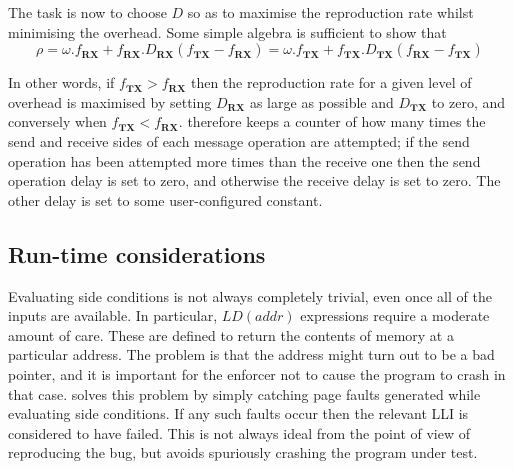The task is now to choose $D$ so as to maximise the reproduction
rate whilst minimising the overhead.  Some simple algebra is
sufficient to show that
\begin{displaymath}
\rho = {\omega}.f_{\mathbf{RX}} + f_{\mathbf{RX}}.D_{\mathbf{RX}}(f_{\mathbf{TX}} - f_{\mathbf{RX}}) = {\omega}.f_{\mathbf{TX}} + f_{\mathbf{TX}}.D_{\mathbf{TX}}(f_{\mathbf{RX}} - f_{\mathbf{TX}})
\end{displaymath}

In other words, if $f_{\mathbf{TX}} > f_{\mathbf{RX}}$ then the
reproduction rate for a given level of overhead is maximised by
setting $D_{\mathbf{RX}}$ as large as possible and $D_{\mathbf{TX}}$
to zero, and conversely when $f_{\mathbf{TX}} < f_{\mathbf{RX}}$.
{\Implementation} therefore keeps a counter of how many times the send
and receive sides of each message operation are attempted; if the send
operation has been attempted more times than the receive one then the
send operation delay is set to zero, and otherwise the receive delay
is set to zero.  The other delay is set to some user-configured
constant.


\subsection{Run-time considerations}


Evaluating side conditions is not always completely trivial, even once
all of the inputs are available.  In particular, $LD(addr)$
expressions require a moderate amount of care.  These are defined to
return the contents of memory at a particular address.  The problem is
that the address might turn out to be a bad pointer, and it is
important for the enforcer not to cause the program to crash in that
case.  {\Implementation} solves this problem by simply catching page
faults generated while evaluating side conditions.  If any such faults
occur then the relevant LLI is considered to have failed.  This is not
always ideal from the point of view of reproducing the bug, but avoids
spuriously crashing the program under test.


